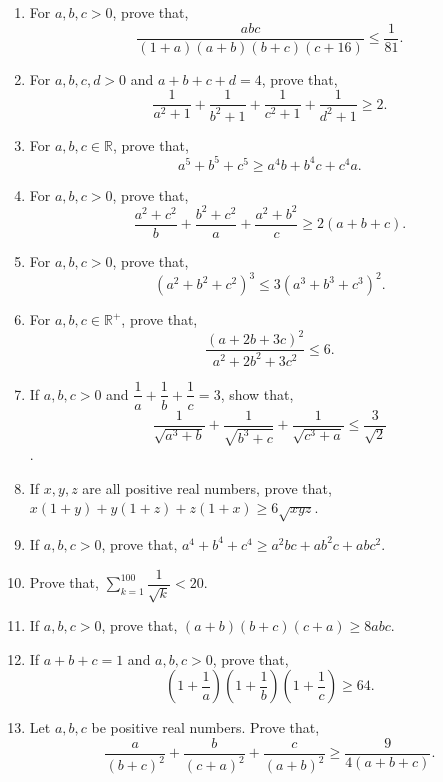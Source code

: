 \documentclass[11pt, a4paper]{article}
\begin{document}
\begin{enumerate}
	\item For $a, b, c > 0$, prove that, $$\dfrac{abc}{(1+a)(a+b)(b+c)(c+16)} \leq \dfrac{1}{81}.$$
	
	\item For $a, b, c, d > 0$ and $a+b+c+d = 4$, prove that, $$\dfrac{1}{a^2 + 1} + \dfrac{1}{b^2 + 1} + \dfrac{1}{c^2 + 1} + \dfrac{1}{d^2 + 1} \geq 2.$$
	
	\item For $a, b, c \in \mathbb{R}$, prove that, $$a^5 + b^5 + c^5 \geq a^4b + b^4c + c^4a.$$
	
	\item For $a, b, c > 0$, prove that, $$\dfrac{a^2 + c^2}{b} + \dfrac{b^2 + c^2}{a} + \dfrac{a^2 + b^2}{c} \geq 2(a+b+c).$$
	
	\item For $a, b, c > 0$, prove that, $$(a^2 + b^2 + c^2)^3 \leq 3 (a^3 + b^3 + c^3)^2.$$
	
	\item For $a, b, c \in \mathbb{R^+}$, prove that, $$\dfrac{(a+2b+3c)^2}{a^2 + 2b^2 + 3c^2} \leq 6.$$
	
	\item If $a, b, c > 0$ and $\dfrac{1}{a} + \dfrac{1}{b} + \dfrac{1}{c} = 3$, show that, 
	$$\dfrac{1}{\sqrt{a^3+b}} + \dfrac{1}{\sqrt{b^3+c}} + \dfrac{1}{\sqrt{c^3+a}} \leq \dfrac{3}{\sqrt{2}}$$.
	
	\item If $x, y, z$ are all positive real numbers, prove that, $x(1+y) + y(1+z) + z(1+x) \geq 6\sqrt{xyz}$.
	
	\item If $a, b, c > 0$, prove that, $a^4 + b^4 + c^4 \geq a^2bc + ab^2c + abc^2$.
	
	\item Prove that, $\sum \limits_{k = 1}^{100} \dfrac{1}{\sqrt{k}} < 20$.
	
	\item If $a, b, c > 0$, prove that, $(a+b)(b+c)(c+a) \geq 8abc$.
	
	\item If $a+b+c = 1$ and $a, b, c > 0$, prove that, $$\left( 1 + \dfrac{1}{a} \right) \left( 1 + \dfrac{1}{b} \right) \left( 1 + \dfrac{1}{c} \right) \geq 64.$$
	
	\item Let $a, b, c$ be positive real numbers. Prove that, $$\dfrac{a}{(b+c)^2} + \dfrac{b}{(c+a)^2} + \dfrac{c}{(a+b)^2} \geq \dfrac{9}{4(a+b+c)}.$$
	

\end{enumerate}
\end{document}
